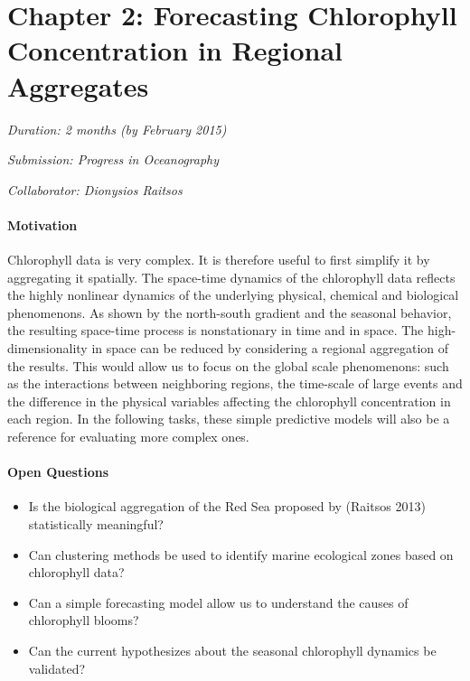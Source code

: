 \section{Chapter 2: Forecasting Chlorophyll Concentration in Regional Aggregates}

\noindent
\emph{Duration: 2 months (by February 2015)}

\noindent
\emph{Submission: Progress in Oceanography}

\noindent
\emph{Collaborator: Dionysios Raitsos}

\paragraph{Motivation}

Chlorophyll data is very complex. It is therefore useful to first simplify it by aggregating it spatially. The space-time dynamics of the chlorophyll data reflects the highly nonlinear dynamics of the underlying physical, chemical and biological phenomenons. As shown by the north-south gradient and the seasonal behavior, the resulting space-time process is nonstationary in time and in space. The high-dimensionality in space can be reduced by considering a regional aggregation of the results. This would allow us to focus on the global scale phenomenons: such as the interactions between neighboring regions, the time-scale of large events and the difference in the physical variables affecting the chlorophyll concentration in each region. In the following tasks, these simple predictive models will also be a reference for evaluating more complex ones. 

\paragraph{Open Questions}

\begin{itemize}
\item Is the biological aggregation of the Red Sea proposed by (Raitsos 2013) statistically meaningful?
\item Can clustering methods be used to identify marine ecological zones based on chlorophyll data?
\item Can a simple forecasting model allow us to understand the causes of chlorophyll blooms?
\item Can the current hypothesizes about the seasonal chlorophyll dynamics be validated?
\end{itemize}

